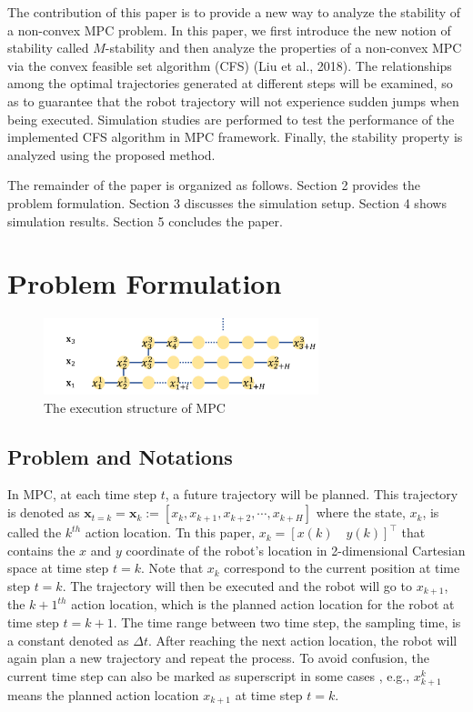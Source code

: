 \documentclass{ifacconf}
\begin{document}
The contribution of this paper is to provide a new way to analyze the stability of a non-convex MPC problem. In this paper, we first introduce the new notion of stability called $M$-stability and then analyze the properties of a non-convex MPC via the convex feasible set algorithm (CFS) (Liu et al., 2018).  The relationships among the optimal trajectories generated at different steps will be examined, so as to  guarantee that the robot trajectory will not experience sudden jumps when being executed. Simulation studies are performed to test the performance of the implemented CFS  algorithm in MPC framework. Finally, the stability property is analyzed using the proposed method.

The remainder of the paper is organized as follows. Section 2 provides the problem formulation. Section 3 discusses the simulation setup. Section 4 shows simulation results. Section 5 concludes the paper.

\section{Problem Formulation}

\begin{figure}[t]
\begin{center}
\includegraphics[width=8cm]{src/MPCstruc.png}
\caption{The execution structure of MPC}
\label{fig: mpc}
\end{center}
\end{figure}

\subsection{Problem and Notations}
In MPC, at each time step $t$, a future trajectory will be planned. This trajectory is denoted as $\mathbf{x}_{t=k}=\mathbf{x}_{k} := [x_k, x_{k+1},x_{k+2},\cdots,x_{k+H}]$ where the state, $x_k$, is called the $k^{th}$ action location. Tn this paper, $x_k= [x(k)\quad y(k)]^{\intercal}$ that contains the $x$ and $y$ coordinate of the robot's location in 2-dimensional Cartesian space at time step $t=k$. Note that $x_k$ correspond to the current position at time step $t=k$. The trajectory will then be executed and the robot will go to $x_{k+1}$, the $k+1^{th}$ action location, which is the planned action location for the robot at time step $t=k+1$. The time range between two time step, the sampling time, is a constant denoted as $\Delta t$. After reaching the next action location, the robot will again plan a new trajectory and repeat the process. To avoid confusion, the current time step can also be marked as superscript in some cases , e.g., $x_{k+1}^k$ means the planned action location $x_{k+1}$ at time step $t=k$.
\end{document}
